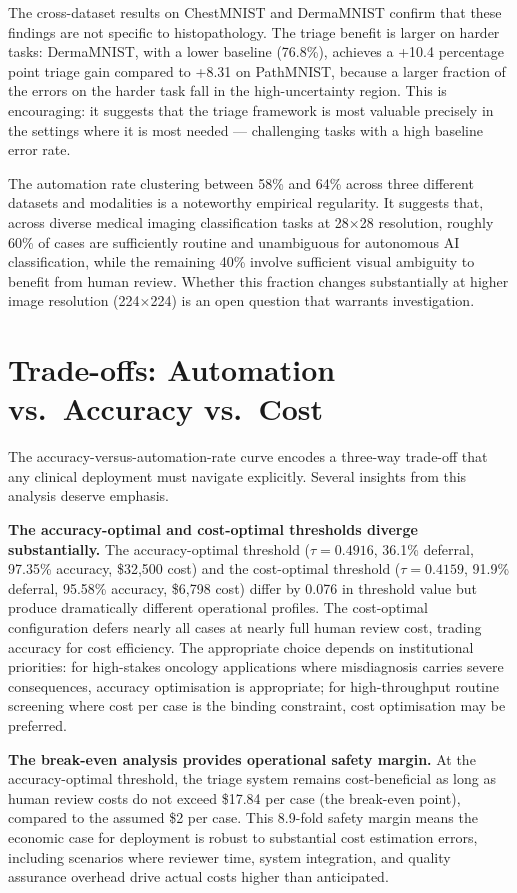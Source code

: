 The cross-dataset results on ChestMNIST and DermaMNIST confirm that these findings are not specific to histopathology. The triage benefit is larger on harder tasks: DermaMNIST, with a lower baseline (76.8\%), achieves a +10.4 percentage point triage gain compared to +8.31 on PathMNIST, because a larger fraction of the errors on the harder task fall in the high-uncertainty region. This is encouraging: it suggests that the triage framework is most valuable precisely in the settings where it is most needed --- challenging tasks with a high baseline error rate.

The automation rate clustering between 58\% and 64\% across three different datasets and modalities is a noteworthy empirical regularity. It suggests that, across diverse medical imaging classification tasks at 28$\times$28 resolution, roughly 60\% of cases are sufficiently routine and unambiguous for autonomous AI classification, while the remaining 40\% involve sufficient visual ambiguity to benefit from human review. Whether this fraction changes substantially at higher image resolution (224$\times$224) is an open question that warrants investigation.

\section{Trade-offs: Automation vs.\ Accuracy vs.\ Cost}

The accuracy-versus-automation-rate curve encodes a three-way trade-off that any clinical deployment must navigate explicitly. Several insights from this analysis deserve emphasis.

\textbf{The accuracy-optimal and cost-optimal thresholds diverge substantially.} The accuracy-optimal threshold ($\tau = 0.4916$, 36.1\% deferral, 97.35\% accuracy, \$32,500 cost) and the cost-optimal threshold ($\tau = 0.4159$, 91.9\% deferral, 95.58\% accuracy, \$6,798 cost) differ by 0.076 in threshold value but produce dramatically different operational profiles. The cost-optimal configuration defers nearly all cases at nearly full human review cost, trading accuracy for cost efficiency. The appropriate choice depends on institutional priorities: for high-stakes oncology applications where misdiagnosis carries severe consequences, accuracy optimisation is appropriate; for high-throughput routine screening where cost per case is the binding constraint, cost optimisation may be preferred.

\textbf{The break-even analysis provides operational safety margin.} At the accuracy-optimal threshold, the triage system remains cost-beneficial as long as human review costs do not exceed \$17.84 per case (the break-even point), compared to the assumed \$2 per case. This 8.9-fold safety margin means the economic case for deployment is robust to substantial cost estimation errors, including scenarios where reviewer time, system integration, and quality assurance overhead drive actual costs higher than anticipated.

